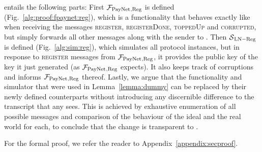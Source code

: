   entails the following parts: First $\mathcal{F}_{\mathrm{PayNet}}{}_{\mathrm{, Reg}}$ is defined
  (Fig.~\ref{alg:proof:fpaynet:reg}), which is a functionality that behaves
  exactly like \fpaynet{} when receiving the messages \textsc{register},
  \textsc{registerDone}, \textsc{toppedUp} and \textsc{corrupted}, but simply
  forwards all other messages along with the sender to \simulator. Then
  $\mathcal{S}{}_{\mathrm{LN - Reg}}$ is defined (Fig.~\ref{alg:sim:reg}), which
  simulates all protocol instances, but in response to \textsc{register}
  messages from $\mathcal{F}_{\mathrm{PayNet}}{}_{\mathrm{, Reg}}$, it provides the public key of the
  key it just generated (as $\mathcal{F}_{\mathrm{PayNet}}{}_{\mathrm{, Reg}}$ expects). It also
  keeps track of corruptions and informs $\mathcal{F}_{\mathrm{PayNet}}{}_{\mathrm{, Reg}}$ thereof.
  Lastly, we argue that the functionality and simulator that were used in
  Lemma~\ref{lemma:dummy} can be replaced by their newly defined counterparts
  without introducing any discernible difference to the transcript that any
  \environment{} sees. This is achieved by exhaustive enumeration of all
  possible messages and comparison of the behaviour of the ideal and the real
  world for each, to conclude that the change is transparent to \environment.

  For the formal proof, we refer the reader to Appendix~\ref{appendix:secproof}.
